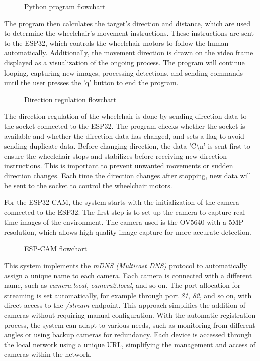 \begin{figure}[H]
  \centering
  \resizebox{1\linewidth}{!}{
    
  }
  \caption{Python program flowchart}
\end{figure}

The program then calculates the target's direction and distance, which are used to determine the wheelchair's movement instructions. These instructions are sent to the ESP32, which controls the wheelchair motors to follow the human automatically. Additionally, the movement direction is drawn on the video frame displayed as a visualization of the ongoing process. The program will continue looping, capturing new images, processing detections, and sending commands until the user presses the 'q' button to end the program.

\begin{figure}[H]
  \centering
  \resizebox{.8\linewidth}{!}{
    
  }
  \caption{Direction regulation flowchart}
\end{figure}

The direction regulation of the wheelchair is done by sending direction data to the socket connected to the ESP32. The program checks whether the socket is available and whether the direction data has changed, and sets a flag to avoid sending duplicate data. Before changing direction, the data 'C\textbackslash n' is sent first to ensure the wheelchair stops and stabilizes before receiving new direction instructions. This is important to prevent unwanted movements or sudden direction changes. Each time the direction changes after stopping, new data will be sent to the socket to control the wheelchair motors.

For the ESP32 CAM, the system starts with the initialization of the camera connected to the ESP32. The first step is to set up the camera to capture real-time images of the environment. The camera used is the OV5640 with a 5MP resolution, which allows high-quality image capture for more accurate detection.

\begin{figure}[H]
  \centering
  \resizebox{.7\linewidth}{!}{
    
  }
  \caption{ESP-CAM flowchart}
\end{figure}

This system implements the \emph{mDNS (Multicast DNS)} protocol to automatically assign a unique name to each camera. Each camera is connected with a different name, such as \emph{camera.local}, \emph{camera2.local}, and so on. The port allocation for streaming is set automatically, for example through port \emph{81}, \emph{82}, and so on, with direct access to the \emph{/stream} endpoint. This approach simplifies the addition of cameras without requiring manual configuration. With the automatic registration process, the system can adapt to various needs, such as monitoring from different angles or using backup cameras for redundancy. Each device is accessed through the local network using a unique URL, simplifying the management and access of cameras within the network.

